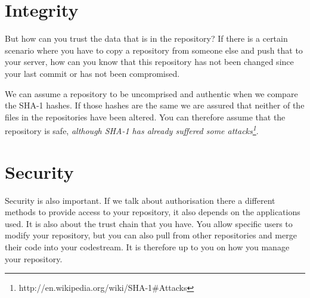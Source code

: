 \section{Integrity}
\label{sec:integrity}
But how can you trust the data that is in the repository? If there is a certain scenario where you have to copy a repository from someone else and push that to your server, how can you know that this repository has not been changed since your last commit or has not been compromised.

We can assume a repository to be uncomprised and authentic when we compare the SHA-1 hashes. If those hashes are the same we are assured that neither of the files in the repositories have been altered. You can therefore assume that the repository is safe, \textit{although SHA-1 has already suffered some attacks\footnote{http://en.wikipedia.org/wiki/SHA-1\#Attacks}}.

\section{Security}
\label{sec:security}
Security is also important. If we talk about authorisation there a different methods to provide access to your repository, it also depends on the applications used. It is also about the trust chain that you have. You allow specific users to modify your repository, but you can also pull from other repositories and merge their code into your codestream. It is therefore up to you on how you manage your repository.
